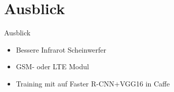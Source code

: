 \section[\thesection \  Ausblick]{Ausblick}\label{sec:conclusion}

\begin{frame}{Ausblick} %

        \begin{itemize}
            \item Bessere Infrarot Scheinwerfer
            \item GSM- oder LTE Modul
        \end{itemize}
        \begin{itemize}
            \item Training mit auf Faster R-CNN+VGG16 in Caffe 
        \end{itemize}

\end{frame}